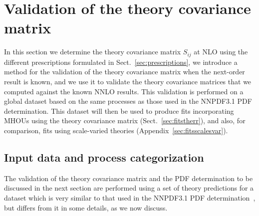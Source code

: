 \section{Validation of the theory covariance matrix}
\label{sec:results}

In this section we determine the theory covariance matrix $S_{ij}$ at NLO
using the different prescriptions formulated in
Sect.~\ref{sec:prescriptions}, we introduce a method for the
validation of the theory covariance matrix when the next-order result
is known, and we use it to validate the theory covariance matrices
that we computed against the known NNLO results.
%
This validation is performed on a global dataset based on the same processes
as those used in the NNPDF3.1 PDF determination.
%
This dataset will then be used to produce fits incorporating MHOUs using 
the theory covariance matrix (Sect.~\ref{sec:fitstherr}), and also,
for comparison,  
fits using scale-varied theories (Appendix~\ref{sec:fitsscalesvar}).
 
\subsection{Input data and process categorization}
\label{sec:inputdata}

The validation of the theory covariance matrix and the PDF
determination to be discussed in the next section are performed using
a set of theory predictions for a dataset which is very similar to 
that used in the NNPDF3.1 PDF determination~\cite{Ball:2017nwa}, but
differs from it in some details, as we now discuss.

